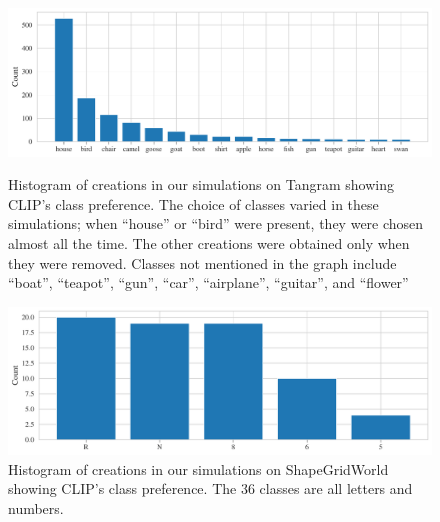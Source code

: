 \begin{figure}[h]
    \centering
    \includegraphics[width=\textwidth]{images/creations_distribution.pdf}
    \vspace{-12pt}
    \caption[Histogram of creations in our simulations on Tangram showing CLIP's class preference.]{Histogram of creations in our simulations on Tangram showing CLIP's class preference. The choice of classes varied in these simulations; when ``house'' or ``bird'' were present, they were chosen almost all the time. The other creations were obtained only when they were removed. Classes not mentioned in the graph include ``boat'', ``teapot'', ``gun'', ``car'', ``airplane'', ``guitar'', and ``flower''}
    \label{fig:class-preference-tangram}
    \vspace{12pt}
    \includegraphics[width=\textwidth]{images/creations_distribution_sgw.pdf}
    \vspace{-12pt}
    \caption[Histogram of creations in our simulations on ShapeGridWorld showing CLIP's class preference.]{Histogram of creations in our simulations on ShapeGridWorld showing CLIP's class preference. The \(36\) classes are all letters and numbers.}
    \label{fig:class-preference-sgw}
\end{figure}


